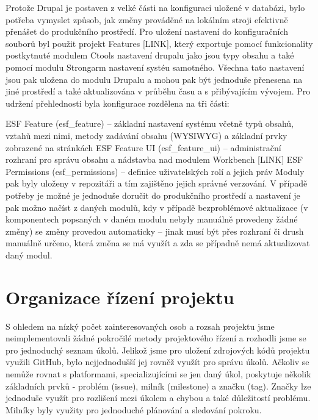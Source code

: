 \documentclass[10pt,draft,oneside]{fithesis2}
\begin{document}
Protože Drupal je postaven z velké části na konfiguraci uložené v databázi, bylo potřeba vymyslet způsob, jak změny prováděné na lokálním stroji efektivně přenášet do produkčního prostředí. Pro uložení nastavení do konfiguračních souborů byl použit projekt Features [LINK], který exportuje pomocí funkcionality postkytnuté modulem Ctools nastavení drupalu jako jsou typy obsahu a také pomocí modulu Strongarm nastavení systéu samotného. Všechna tato nastavení jsou pak uložena do modulu Drupalu a mohou pak být jednoduše přenesena na jiné prostředí a také aktualizována v průběhu času a s přibývajícím vývojem. Pro udržení přehlednosti byla konfigurace rozdělena na tři části:

ESF Feature (esf\_feature) – základní nastavení systému včetně typů obsahů, vztahů mezi nimi, metody zadávání obsahu (WYSIWYG) a základní prvky zobrazené na stránkách
ESF Feature UI (esf\_feature\_ui) – administrační rozhraní pro správu obsahu a nádstavba nad modulem Workbench [LINK]
ESF Permissions (esf\_permissions) – definice uživatelských rolí a jejich práv
Moduly pak byly uloženy v repozitáři a tím zajištěno jejich správné verzování. V případě potřeby je možné je jednoduše doručit do produkčního prostředí a nastavení je pak možno načíst z daných modulů, kdy v případě bezproblémové aktualizace (v komponentech popsaných v daném modulu nebyly manuálně provedeny žádné změny) se změny provedou automaticky – jinak musí být přes rozhraní či drush manuálně určeno, která změna se má využít a zda se případně nemá aktualizovat daný modul.

\section{Organizace řízení projektu}
S ohledem na nízký počet zainteresovaných osob a rozsah projektu jsme neimplementovali žádné pokročilé metody projektového řízení a rozhodli jsme se pro jednoduchý seznam úkolů. Jelikož jsme pro uložení zdrojových kódů projektu využili GitHub, bylo nejjednodušší jej rovněž využít pro správu úkolů. Ačkoliv se nemůže rovnat s platformami, specializujícími se jen daný úkol, poskytuje několik základních prvků - problém (issue), milník (milestone) a značku (tag). Značky lze jednoduše využít pro rozlišení mezi úkolem a chybou a také důležitostí problému. Milníky byly využity pro jednoduché plánování a sledování pokroku.
\end{document}
